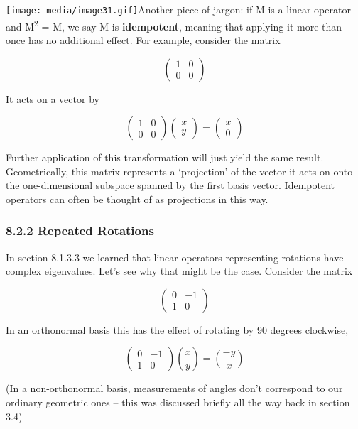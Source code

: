 \documentclass[oneside,english]{amsbook}
\numberwithin{section}{chapter}
\theoremstyle{plain}
\theoremstyle{definition}
\begin{document}
\texttt{[image: media/image31.gif]}Another
piece of jargon: if M is a linear operator and M\textsuperscript{2} = M,
we say M is \textbf{idempotent}, meaning that applying it more than once
has no additional effect. For example, consider the matrix

\[\begin{pmatrix}
	1 & 0 \\
	0 & 0
\end{pmatrix}\]

It acts on a vector by

\[\begin{pmatrix}
	1 & 0 \\
	0 & 0
\end{pmatrix}\begin{pmatrix}
	x \\
	y
\end{pmatrix} = \begin{pmatrix}
	x \\
	0
\end{pmatrix}\]

Further application of this transformation will just yield the same
result. Geometrically, this matrix represents a `projection' of the
vector it acts on onto the one-dimensional subspace spanned by the first
basis vector. Idempotent operators can often be thought of as
projections in this way.

\subsubsection{8.2.2 Repeated Rotations}\label{repeated-rotations}

In section 8.1.3.3 we learned that linear operators representing
rotations have complex eigenvalues. Let's see why that might be the
case. Consider the matrix

\[\begin{pmatrix}
	0 & - 1 \\
	1 & 0
\end{pmatrix}\]

In an orthonormal basis this has the effect of rotating by 90 degrees
clockwise,

\[\begin{pmatrix}
	0 & - 1 \\
	1 & 0
\end{pmatrix}\binom{x}{y} = \binom{- y}{x}\]

(In a non-orthonormal basis, measurements of angles don't correspond to
our ordinary geometric ones -- this was discussed briefly all the way
back in section 3.4)
\end{document}
